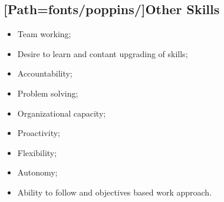 \vspace{5pt}

\subsection*{[Path=fonts/poppins/]Other Skills}

\begin{minipage}[t]{0.5\textwidth}
	\begin{itemize}
		\item Team working;
		\item Desire to learn and contant upgrading of skills;
		\item Accountability;
		\item Problem solving;
		\item Organizational capacity;
	\end{itemize}
\end{minipage}
\begin{minipage}[t]{0.5\textwidth}
	\begin{itemize}
		\item Proactivity;
		\item Flexibility;
		\item Autonomy;
		\item Ability to follow and objectives based work approach.
	\end{itemize}
\end{minipage}

\vspace{5pt}